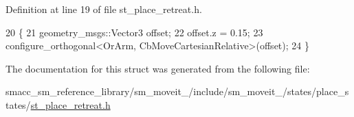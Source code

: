 Definition at line 19 of file st\+\_\+place\+\_\+retreat.\+h.


\begin{DoxyCode}
20     \{
21         geometry\_msgs::Vector3 offset;
22         offset.z = 0.15;
23         configure\_orthogonal<OrArm, CbMoveCartesianRelative>(offset);
24     \}
\end{DoxyCode}


The documentation for this struct was generated from the following file\+:\begin{DoxyCompactItemize}
\item 
smacc\+\_\+sm\+\_\+reference\+\_\+library/sm\+\_\+moveit\+\_/include/sm\+\_\+moveit\+\_/states/place\+\_\+states/\hyperlink{3_2include_2sm__moveit__3_2states_2place__states_2st__place__retreat_8h}{st\+\_\+place\+\_\+retreat.\+h}\end{DoxyCompactItemize}
